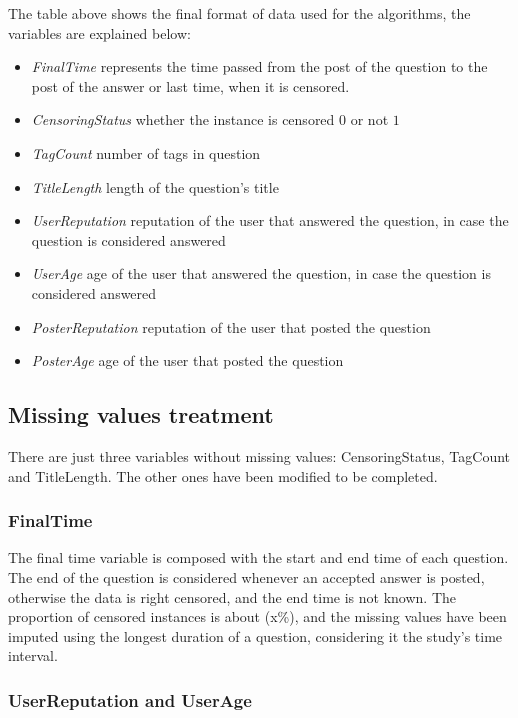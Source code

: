 \documentclass[11pt]{book} %
\begin{document}
    The table above shows the final format of data used for the algorithms, the variables are explained below:
    \begin{itemize}
      \item \emph{FinalTime} represents the time passed from the post of the question to the post of the answer or last time, when it is censored.
      \item \emph{CensoringStatus} whether the instance is censored $0$ or not $1$
      \item \emph{TagCount} number of tags in question
      \item \emph{TitleLength} length of the question's title
      \item \emph{UserReputation} reputation of the user that answered the question, in case the question is considered answered
      \item \emph{UserAge} age of the user that answered the question, in case the question is considered answered
      \item \emph{PosterReputation} reputation of the user that posted the question
      \item \emph{PosterAge} age of the user that posted the question
    \end{itemize}

  \subsection{Missing values treatment}

    There are just three variables without missing values: CensoringStatus, TagCount and TitleLength. The other ones have been modified to be completed.

    \subsubsection{FinalTime}

      The final time variable is composed with the start and end time of each question. The end of the question is considered whenever an accepted answer is posted, otherwise the data is right censored, and the end time is not known. The proportion of censored instances is about (x\%), and the missing values have been imputed using the longest duration of a question, considering it the study's time interval.

    \subsubsection{UserReputation and UserAge}
\end{document}
